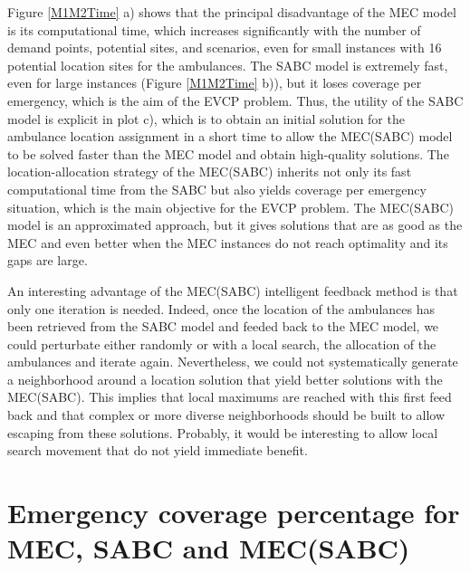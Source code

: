 Figure \ref{M1M2Time} a) shows that the principal disadvantage of the MEC model is its computational time, which increases significantly with the number of demand points, potential sites, and scenarios, even for small instances with 16 potential location sites for the ambulances. The SABC model is extremely fast, even for large instances (Figure \ref{M1M2Time} b)), but it loses coverage per emergency, which is the aim of the EVCP problem. Thus, the utility of the SABC model is explicit in plot c), which is to obtain an initial solution for the ambulance location assignment in a short time to allow the MEC(SABC) model to be solved faster than the MEC model and obtain high-quality solutions. The location-allocation strategy of the MEC(SABC) inherits not only its fast computational time from the SABC but also yields coverage per emergency situation, which is the main objective for the EVCP problem. The MEC(SABC) model is an approximated approach, but it gives solutions that are as good as the MEC and even better when the MEC instances do not reach optimality and its gaps are large.  %

An interesting advantage of the MEC(SABC) intelligent feedback method is that only one iteration is needed. Indeed, once the location of the ambulances has been retrieved from the SABC model and feeded back to the MEC model, we could perturbate either randomly or with a local search, the allocation of the ambulances and iterate again. Nevertheless, we could not systematically generate a neighborhood around a location solution that yield better solutions with the MEC(SABC). This implies that local maximums are reached with this first feed back and that complex or more diverse neighborhoods should be built to allow escaping from these solutions. Probably, it would be interesting to allow local search movement that do not yield immediate benefit.  

\section{Emergency coverage percentage for MEC, SABC and MEC(SABC)} \label{cov type}


